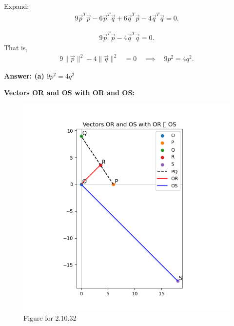 \documentclass[journal]{IEEEtran}
\begin{document}
Expand:
\begin{align*}
9\vec{p}^T\vec{p} - 6\vec{p}^T\vec{q} + 6\vec{q}^T\vec{p} - 4\vec{q}^T\vec{q} = 0.
\end{align*}

\begin{align*}
9\vec{p}^T\vec{p} - 4\vec{q}^T\vec{q} = 0.
\end{align*}
That is,
\begin{align*}
9\|\vec{p}\|^2 - 4\|\vec{q}\|^2 &= 0 
\quad \implies \quad 
9p^2 = 4q^2.
\end{align*}


\textbf{Answer: (a)} $9p^2 = 4q^2$
\newpage

\textbf{Vectors OR and OS with OR and OS:}
\begin{figure}[h!]
    \centering
    \includegraphics[width=1.0\columnwidth]{figs/fig1.png}
    \caption{Figure for 2.10.32}
    \label{fig1}
\end{figure}
\end{document}
